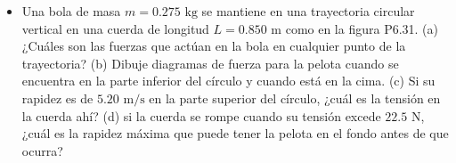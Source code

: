 \documentclass[11pt,a4paper]{article}
\begin{document}
\begin{itemize}
    \item[\textbf{31.}] Una bola de masa $m = 0.275 \text{ kg}$ se mantiene en una trayectoria circular vertical en una cuerda de longitud $L = 0.850 \text{ m}$ como en la figura P6.31. (a) ¿Cuáles son las fuerzas que actúan en la bola en cualquier punto de la trayectoria? (b) Dibuje diagramas de fuerza para la pelota cuando se encuentra en la parte inferior del círculo y cuando está en la cima. (c) Si su rapidez es de $5.20 \text{ m/s}$ en la parte superior del círculo, ¿cuál es la tensión en la cuerda ahí? (d) si la cuerda se rompe cuando su tensión excede $22.5 \text{ N}$, ¿cuál es la rapidez máxima que puede tener la pelota en el fondo antes de que ocurra?
    \vspace*{8cm}
\end{itemize}

\newpage
\end{document}
